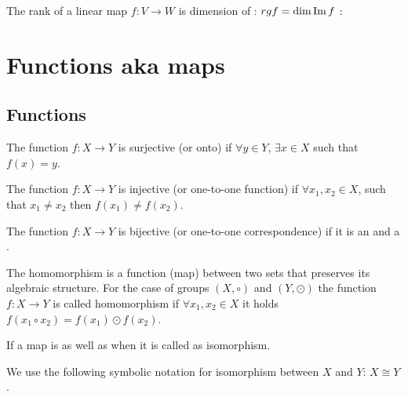 \begin{appendices}
\begin{definition}[Rank]
  The rank of a linear map $f: V \to W$ is dimension of
  : $rg f = \dim \operatorname{Im} f$ \cite{wiki:rank}:
  \label{def:rank}
\end{definition}

\section{Functions aka maps}

\subsection{Functions}

\begin{definition}[Surjection]
  The function $f: X \rightarrow Y$ is surjective (or onto) if
  $\forall y \in Y$, $\exists x \in X$ such that
  $f\left(x\right) = y$.
  \label{def:surjection}
\end{definition}

\begin{definition}[Injection]
  The function $f: X \rightarrow Y$ is injective (or one-to-one function) if
  $\forall x_1, x_2 \in X$, such that $x_1 \ne x_2$ then
  $f\left(x_1\right) \ne f\left(x_2\right)$.
  \label{def:injection}
\end{definition}

\begin{definition}[Bijection]
  The function $f: X \rightarrow Y$ is bijective (or one-to-one
  correspondence) if it is an  and a
  . 
  \label{def:bijection}
\end{definition}

\begin{definition}[Homomorphism]
  The homomorphism is a function (map) between two sets that preserves
  its algebraic structure. For the case of groups
  $\left(X, \circ\right)$ and $\left(Y, \odot\right)$ the function
  $f: X \rightarrow Y$ is called homomorphism if
  $\forall x_1, x_2 \in X$ it holds
  $f\left(x_1 \circ x_2\right) = f\left(x_1 \right) \odot f\left( x_2\right)$.
  \label{def:homomorphism}
\end{definition}

\begin{definition}[Isomorphism]
  If a map is  as well as
   when it is called as isomorphism.

  We use the following symbolic notation for isomorphism between $X$
  and $Y$: $X \cong Y$.
  \label{def:isomorphism}
\end{definition}


\end{appendices}
